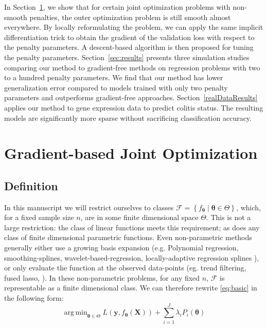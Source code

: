 \documentclass[12pt]{article}
\DeclareMathOperator*{\argmin}{arg\,min}
\begin{document}
In Section~\ref{defineDescJointOpt}, we show that for certain joint optimization problems with non-smooth penalties, the outer optimization problem is still smooth almost everywhere. By locally reformulating the problem, we can apply the same implicit differentiation trick to obtain the gradient of the validation loss with respect to the penalty parameters. A descent-based algorithm is then proposed for tuning the penalty parameters. Section~\ref{sec:results} presents three simulation studies comparing our method to gradient-free methods on regression problems with two to a hundred penalty parameters. We find that our method has lower generalization error compared to models trained with only two penalty parameters and outperforms gradient-free approaches. Section~\ref{realDataResults} applies our method to gene expression data to predict colitis status. The resulting models are significantly more sparse without sacrificing classification accuracy.

\section{Gradient-based Joint Optimization}\label{defineDescJointOpt}
\subsection{Definition}
In this manuscript we will restrict ourselves to classes $\mathcal{F} = \left\{f_{\boldsymbol \theta}\middle| \boldsymbol \theta\in\Theta\right\}$, which, for a fixed sample size $n$, are in some finite dimensional space $\Theta$. This is not a large restriction: the class of linear functions meets this requirement; as does any class of finite dimensional parametric functions. Even non-parametric methods generally either use a growing basis expansion (e.g. Polynomial regression, smoothing-splines, wavelet-based-regression, locally-adaptive regression splines \citep{tsybakov2008introduction, wahba1981spline, donoho1994ideal, mammen1997locally}), or only evaluate the function at the observed data-points (eg. trend filtering, fused lasso, \citep{kim2009ell_1, tibshirani2005sparsity}). In these non-parametric problems, for any fixed $n$, $\mathcal{F}$ is representable as a finite dimensional class.
We can therefore rewrite \eqref{eq:basic} in the following form:
\begin{equation}\label{eq:train_disc}
\argmin_{\boldsymbol \theta \in \Theta} L(\boldsymbol{y}, f_{\boldsymbol \theta}(\boldsymbol{X})) + \sum\limits_{i=1}^J \lambda_i P_i(\boldsymbol \theta)
\end{equation}
\end{document}
